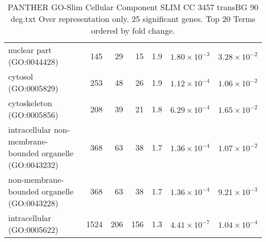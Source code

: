 \begin{table}[ht]
\begin{adjustbox}{width=\textwidth}
\begin{tabular}{lrrrrrr}
  nuclear part (GO:0044428) & 145 & 29 & 15 & 1.9 & $1.80 \times 10^{-3}$ & $3.28 \times 10^{-2}$ \\ 
  cytosol (GO:0005829) & 253 & 48 & 26 & 1.9 & $1.12 \times 10^{-4}$ & $1.06 \times 10^{-2}$ \\ 
  cytoskeleton (GO:0005856) & 208 & 39 & 21 & 1.8 & $6.29 \times 10^{-4}$ & $1.65 \times 10^{-2}$ \\ 
  intracellular non-membrane-bounded organelle (GO:0043232) & 368 & 63 & 38 & 1.7 & $1.36 \times 10^{-4}$ & $1.07 \times 10^{-2}$ \\ 
  non-membrane-bounded organelle (GO:0043228) & 368 & 63 & 38 & 1.7 & $1.36 \times 10^{-4}$ & $9.21 \times 10^{-3}$ \\ 
  intracellular (GO:0005622) & 1524 & 206 & 156 & 1.3 & $4.41 \times 10^{-7}$ & $1.04 \times 10^{-4}$ \\ 
   \hline
\end{tabular}
\end{adjustbox}
\caption{PANTHER GO-Slim Cellular Component SLIM CC 3457 transBG 90 deg.txt Over representation only. 25 significant genes. Top 20 Terms ordered by fold change. } 
\label{tab:PANTHER GO-Slim Cellular Component SLIM CC 3457 transBG 90 deg.txt Over representation only. 25 significant genes. Top 20 Terms ordered by fold change. }
\end{table}


